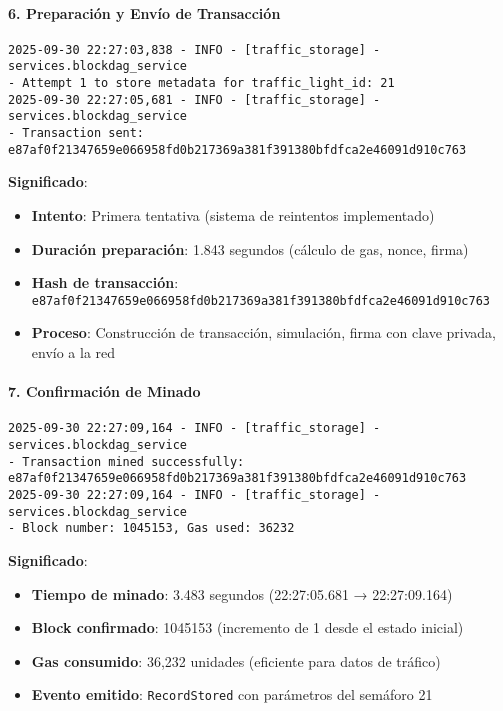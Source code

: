 \documentclass[onecolumn]{article}
\begin{document}
\paragraph{6. Preparación y Envío de Transacción}
\begin{verbatim}
2025-09-30 22:27:03,838 - INFO - [traffic_storage] - services.blockdag_service 
- Attempt 1 to store metadata for traffic_light_id: 21
2025-09-30 22:27:05,681 - INFO - [traffic_storage] - services.blockdag_service 
- Transaction sent: e87af0f21347659e066958fd0b217369a381f391380bfdfca2e46091d910c763
\end{verbatim}
\textbf{Significado}:
\begin{itemize}
    \item \textbf{Intento}: Primera tentativa (sistema de reintentos implementado)
    \item \textbf{Duración preparación}: 1.843 segundos (cálculo de gas, nonce, firma)
    \item \textbf{Hash de transacción}: \texttt{e87af0f21347659e066958fd0b217369a381f391380bfdfca2e46091d910c763}
    \item \textbf{Proceso}: Construcción de transacción, simulación, firma con clave privada, envío a la red
\end{itemize}

\paragraph{7. Confirmación de Minado}
\begin{verbatim}
2025-09-30 22:27:09,164 - INFO - [traffic_storage] - services.blockdag_service 
- Transaction mined successfully: e87af0f21347659e066958fd0b217369a381f391380bfdfca2e46091d910c763
2025-09-30 22:27:09,164 - INFO - [traffic_storage] - services.blockdag_service 
- Block number: 1045153, Gas used: 36232
\end{verbatim}
\textbf{Significado}:
\begin{itemize}
    \item \textbf{Tiempo de minado}: 3.483 segundos (22:27:05.681 → 22:27:09.164)
    \item \textbf{Block confirmado}: 1045153 (incremento de 1 desde el estado inicial)
    \item \textbf{Gas consumido}: 36,232 unidades (eficiente para datos de tráfico)
    \item \textbf{Evento emitido}: \texttt{RecordStored} con parámetros del semáforo 21
\end{itemize}
\end{document}
